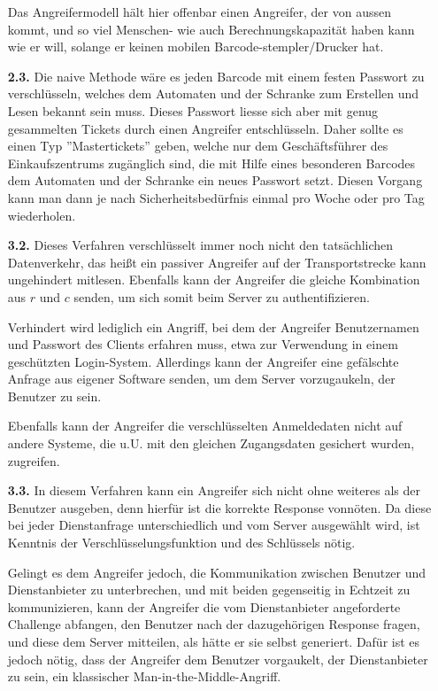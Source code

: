 \documentclass[a4paper,11pt]{article}
\begin{document}
\begin{enumerate}
    Das Angreifermodell hält hier offenbar einen Angreifer, der von aussen kommt, und so viel Menschen- wie auch Berechnungskapazität haben kann wie er will, solange er keinen mobilen Barcode-stempler/Drucker hat.

\item[\textbf{2.3.}]
    Die naive Methode wäre es jeden Barcode mit einem festen Passwort zu verschlüsseln, welches dem Automaten und der Schranke zum Erstellen und Lesen bekannt sein muss. Dieses Passwort liesse sich aber mit genug gesammelten Tickets durch einen Angreifer entschlüsseln. Daher sollte es einen Typ ''Mastertickets'' geben, welche nur dem Geschäftsführer des Einkaufszentrums zugänglich sind, die mit Hilfe eines besonderen Barcodes dem Automaten und der Schranke ein neues Passwort setzt. Diesen Vorgang kann man dann je nach Sicherheitsbedürfnis einmal pro Woche oder pro Tag wiederholen.

\item[\textbf{3.2.}]
    Dieses Verfahren verschlüsselt immer noch nicht den tatsächlichen Datenverkehr, das heißt ein passiver Angreifer auf der Transportstrecke kann ungehindert mitlesen. Ebenfalls kann der Angreifer die gleiche Kombination aus $r$ und $c$ senden, um sich somit beim Server zu authentifizieren.

    Verhindert wird lediglich ein Angriff, bei dem der Angreifer Benutzernamen und Passwort des Clients erfahren muss, etwa zur Verwendung in einem geschützten Login-System. Allerdings kann der Angreifer eine gefälschte Anfrage aus eigener Software senden, um dem Server vorzugaukeln, der Benutzer zu sein.

    Ebenfalls kann der Angreifer die verschlüsselten Anmeldedaten nicht auf andere Systeme, die u.U. mit den gleichen Zugangsdaten gesichert wurden, zugreifen.

\item[\textbf{3.3.}]
    In diesem Verfahren kann ein Angreifer sich nicht ohne weiteres als der Benutzer ausgeben, denn hierfür ist die korrekte Response vonnöten. Da diese bei jeder Dienstanfrage unterschiedlich und vom Server ausgewählt wird, ist Kenntnis der Verschlüsselungsfunktion und des Schlüssels nötig.

    Gelingt es dem Angreifer jedoch, die Kommunikation zwischen Benutzer und Dienstanbieter zu unterbrechen, und mit beiden gegenseitig in Echtzeit zu kommunizieren, kann der Angreifer die vom Dienstanbieter angeforderte Challenge abfangen, den Benutzer nach der dazugehörigen Response fragen, und diese dem Server mitteilen, als hätte er sie selbst generiert. Dafür ist es jedoch nötig, dass der Angreifer dem Benutzer vorgaukelt, der Dienstanbieter zu sein, ein klassischer Man-in-the-Middle-Angriff.


\end{enumerate}
\end{document}
